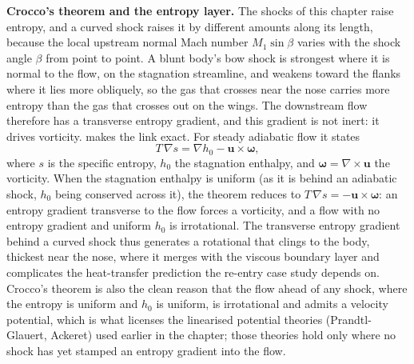 

\begin{mastery}
\textbf{Crocco's theorem and the entropy layer.} The shocks of this
chapter raise entropy, and a curved shock raises it by different
amounts along its length, because the local upstream normal Mach number
$M_1\sin\beta$ varies with the shock angle $\beta$ from point to point.
A blunt body's bow shock is strongest where it is normal to the flow,
on the stagnation streamline, and weakens toward the flanks where it
lies more obliquely, so the gas that crosses near the nose carries more
entropy than the gas that crosses out on the wings. The downstream flow
therefore has a transverse entropy gradient, and this gradient is not
inert: it drives vorticity.  makes the link
exact. For steady adiabatic flow it states
\[
T\,\nabla s = \nabla h_0 - \mathbf{u}\times\boldsymbol{\omega},
\]
where $s$ is the specific entropy, $h_0$ the stagnation enthalpy, and
$\boldsymbol{\omega} = \nabla\times\mathbf{u}$ the vorticity. When the
stagnation enthalpy is uniform (as it is behind an adiabatic shock,
$h_0$ being conserved across it), the theorem reduces to $T\,\nabla s =
-\mathbf{u}\times\boldsymbol{\omega}$: an entropy gradient transverse to
the flow forces a vorticity, and a flow with no entropy gradient and
uniform $h_0$ is irrotational. The transverse entropy gradient behind a
curved shock thus generates a rotational  that
clings to the body, thickest near the nose, where it merges with the
viscous boundary layer and complicates the heat-transfer prediction the
re-entry case study depends on. Crocco's theorem is also the clean
reason that the flow ahead of any shock, where the entropy is uniform
and $h_0$ is uniform, is irrotational and admits a velocity potential,
which is what licenses the linearised potential theories (Prandtl-
Glauert, Ackeret) used earlier in the chapter; those theories hold only
where no shock has yet stamped an entropy gradient into the flow.
\end{mastery}

